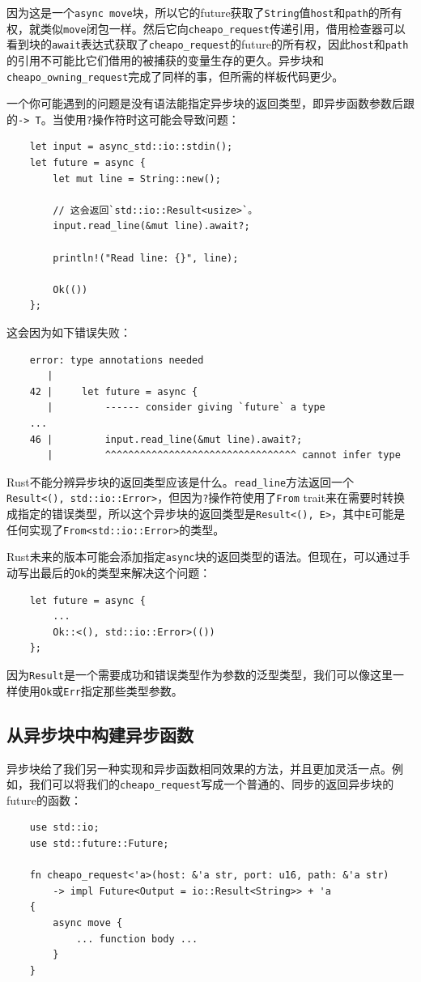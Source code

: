 因为这是一个\texttt{async move}块，所以它的future获取了\texttt{String}值\texttt{host}和\texttt{path}的所有权，就类似\texttt{move}闭包一样。然后它向\texttt{cheapo\_request}传递引用，借用检查器可以看到块的\texttt{await}表达式获取了\texttt{cheapo\_request}的future的所有权，因此\texttt{host}和\texttt{path}的引用不可能比它们借用的被捕获的变量生存的更久。异步块和\texttt{cheapo\_owning\_request}完成了同样的事，但所需的样板代码更少。

一个你可能遇到的问题是没有语法能指定异步块的返回类型，即异步函数参数后跟的\texttt{-> T}。当使用\texttt{?}操作符时这可能会导致问题：
\begin{verbatim}
    let input = async_std::io::stdin();
    let future = async {
        let mut line = String::new();

        // 这会返回`std::io::Result<usize>`。
        input.read_line(&mut line).await?;

        println!("Read line: {}", line);

        Ok(())
    };
\end{verbatim}

这会因为如下错误失败：
\begin{verbatim}
    error: type annotations needed
       |
    42 |     let future = async {
       |         ------ consider giving `future` a type
    ...
    46 |         input.read_line(&mut line).await?;
       |         ^^^^^^^^^^^^^^^^^^^^^^^^^^^^^^^^^ cannot infer type
\end{verbatim}

Rust不能分辨异步块的返回类型应该是什么。\texttt{read\_line}方法返回一个\\
\texttt{Result<(), std::io::Error>}，但因为\texttt{?}操作符使用了\texttt{From} trait来在需要时转换成指定的错误类型，所以这个异步块的返回类型是\texttt{Result<(), E>}，其中\texttt{E}可能是任何实现了\texttt{From<std::io::Error>}的类型。

Rust未来的版本可能会添加指定\texttt{async}块的返回类型的语法。但现在，可以通过手动写出最后的\texttt{Ok}的类型来解决这个问题：
\begin{verbatim}
    let future = async {
        ...
        Ok::<(), std::io::Error>(())
    };
\end{verbatim}

因为\texttt{Result}是一个需要成功和错误类型作为参数的泛型类型，我们可以像这里一样使用\texttt{Ok}或\texttt{Err}指定那些类型参数。

\subsection{从异步块中构建异步函数}
异步块给了我们另一种实现和异步函数相同效果的方法，并且更加灵活一点。例如，我们可以将我们的\texttt{cheapo\_request}写成一个普通的、同步的返回异步块的future的函数：
\begin{verbatim}
    use std::io;
    use std::future::Future;

    fn cheapo_request<'a>(host: &'a str, port: u16, path: &'a str)
        -> impl Future<Output = io::Result<String>> + 'a
    {
        async move {
            ... function body ...
        }
    }
\end{verbatim}

